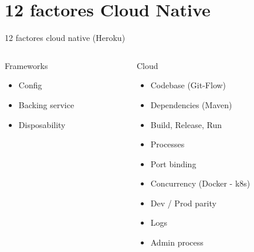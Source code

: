 \documentclass[aspectratio=169]{beamer}
\begin{document}
{
    \section{12 factores Cloud Native}
}


\begin{frame}{12 factores cloud native (Heroku)}

\begin{columns}[T] %

	\begin{column}[T]{4cm} %
		\begin{alertblock}{Frameworks}
			\begin{itemize}
				\item Config
				\item Backing service
				\item Disposability
			\end{itemize}
		\end{alertblock}
	\end{column}
	\begin{column}[T]{6cm} %
		\begin{block}{Cloud}
			\begin{itemize}
				\item Codebase (Git-Flow)
				\item Dependencies (Maven)
				\item Build, Release, Run
				\item Processes
				\item Port binding
				\item Concurrency (Docker - k8s)
				\item Dev / Prod parity
				\item Logs
				\item Admin process
			\end{itemize}
		\end{block}
	\end{column}
\end{columns}

\end{frame}
\end{document}
